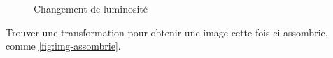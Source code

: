 \begin{figure}[h!]
    \begin{center}
    \end{center}
    \caption{Changement de luminosité}
\end{figure}

\ssques Trouver une transformation pour obtenir une image cette fois-ci assombrie, comme \autoref{fig:img-assombrie}.

